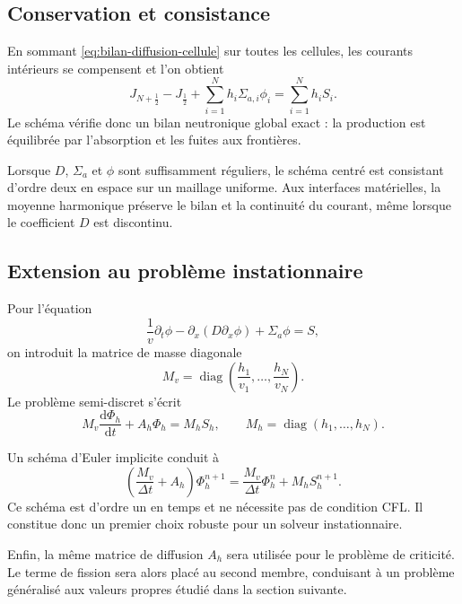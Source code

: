 \documentclass{article}
\begin{document}
\subsection {Conservation et consistance}

En sommant \eqref{eq:bilan-diffusion-cellule} sur toutes les cellules, les courants intérieurs se compensent et l'on obtient
\begin{equation}
    J_{N+\frac12}-J_{\frac12}
    + \sum_{i=1}^{N}h_i\Sigma_{a,i}\phi_i
    = \sum_{i=1}^{N}h_iS_i.
    \label{eq:bilan-global-discret}
\end{equation}
Le schéma vérifie donc un bilan neutronique global exact : la production est équilibrée par l'absorption et les fuites aux frontières.

Lorsque $D$, $\Sigma_a$ et $\phi$ sont suffisamment réguliers, le schéma centré est consistant d'ordre deux en espace sur un maillage uniforme. Aux interfaces matérielles, la moyenne harmonique préserve le bilan et la continuité du courant, même lorsque le coefficient $D$ est discontinu.

\subsection {Extension au problème instationnaire}

Pour l'équation
\[
    \frac{1}{v}\partial_t\phi
    -\partial_x(D\partial_x\phi)
    +\Sigma_a\phi
    =S,
\]
on introduit la matrice de masse diagonale
\[
    M_v = \operatorname{diag} \left( \frac{h_1}{v_1}, \ldots, \frac{h_N}{v_N}\right).
\]
Le problème semi-discret s'écrit
\begin{equation}
    M_v\frac{\mathrm{d}\Phi_h}{\mathrm{d}t} +A_h\Phi_h = M_hS_h,
    \qquad
    M_h=\operatorname{diag}(h_1,\ldots,h_N).
    \label{eq:diffusion-semi-discrete}
\end{equation}

Un schéma d'Euler implicite conduit à
\begin{equation}
    \left(
        \frac{M_v}{\Delta t}+A_h
    \right)\Phi_h^{n+1}
    =
    \frac{M_v}{\Delta t}\Phi_h^n
    +M_hS_h^{n+1}.
    \label{eq:euler-implicite-diffusion}
\end{equation}
Ce schéma est d'ordre un en temps et ne nécessite pas de condition CFL.
Il constitue donc un premier choix robuste pour un solveur
instationnaire.

Enfin, la même matrice de diffusion $A_h$ sera utilisée pour le problème de criticité. Le terme de fission sera alors placé au second membre, conduisant à un problème généralisé aux valeurs propres étudié dans la section suivante.
\end{document}
